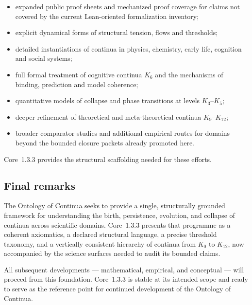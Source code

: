 \begin{itemize}
    \item expanded public proof sheets and mechanized proof coverage for claims not covered by the current Lean-oriented formalization inventory;
    \item explicit dynamical forms of structural tension, flows and thresholds;
    \item detailed instantiations of continua in physics, chemistry, early life, cognition and social systems;
    \item full formal treatment of cognitive continua \(K_6\) and the mechanisms of binding, prediction and model coherence;
    \item quantitative models of collapse and phase transitions at levels \(K_3\)–\(K_5\);
    \item deeper refinement of theoretical and meta-theoretical continua \(K_9\)–\(K_{12}\);
    \item broader comparator studies and additional empirical routes for domains beyond the bounded closure packets already promoted here.
\end{itemize}

Core~1.3.3 provides the structural scaffolding needed for these efforts.

\subsection{Final remarks}

The Ontology of Continua seeks to provide a single, structurally grounded
framework for understanding the birth, persistence, evolution, and collapse of
continua across scientific domains. Core~1.3.3 presents that programme as a
coherent axiomatics, a declared structural language, a precise threshold
taxonomy, and a vertically consistent hierarchy of continua from \(K_0\) to
\(K_{12}\), now accompanied by the science surfaces needed to audit its bounded
claims.

All subsequent developments --- mathematical, empirical, and conceptual ---
will proceed from this foundation. Core~1.3.3 is stable at its intended scope and
ready to serve as the reference point for continued development of the
Ontology of Continua.
